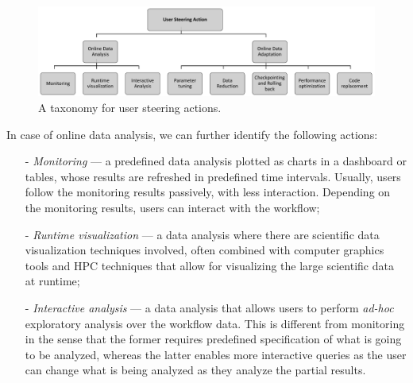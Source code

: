 %
%


\begin{figure}[H]
    \centering
    \includegraphics[width=\textwidth,keepaspectratio]{img/taxonomy-chap3.pdf}
    \caption{A taxonomy for user steering actions.}
    \label{fig:chap3_taxonomy}
\end{figure}


In case of online data analysis, we can further identify the following actions:

 \begin{itemize}
 \setlength\itemsep{-2mm}

    \item[-] \textit{Monitoring} --- a predefined data analysis plotted as charts in a dashboard or tables, whose results are refreshed in predefined time intervals. Usually, users follow the monitoring results passively, with less interaction. Depending on the monitoring results, users can interact with the workflow;

    \item[-] \textit{Runtime visualization} --- a data analysis where there are scientific data visualization techniques involved, often combined with computer graphics tools and HPC techniques that allow for visualizing the large scientific data at runtime;

    \item[-] \textit{Interactive analysis} --- a data analysis that allows users to perform \textit{ad-hoc} exploratory analysis over the workflow data. This is different from monitoring in the sense that the former requires predefined specification of what is going to be analyzed, whereas the latter enables more interactive queries as the user can change what is being analyzed as they analyze the partial results.

 \end{itemize}

